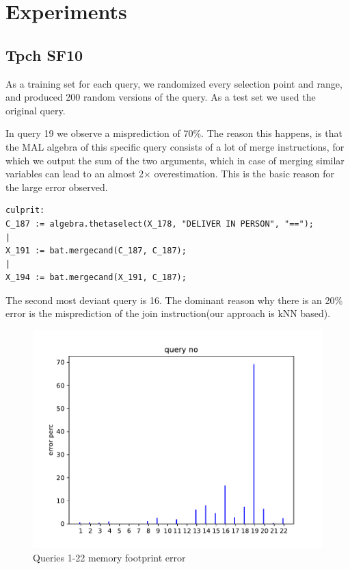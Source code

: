 \section{Experiments}
\subsection{Tpch SF10}
As a training set for each query, we randomized every selection point and range,
and produced 200 random versions of the query. As a test set we used the original
query.

In query 19 we observe a misprediction of 70\%. The reason this happens, is that
the MAL algebra of this specific query consists of a lot of merge instructions,
for which we output the sum of the two arguments, which in case of merging similar
variables can lead to an almost 2$\times$ overestimation.
This is the basic reason for the large error observed.
\begin{verbatim}
culprit:
C_187 := algebra.thetaselect(X_178, "DELIVER IN PERSON", "==");                                                                                                                                                                                                                    |
X_191 := bat.mergecand(C_187, C_187);                                                                                                                                                                                                                                              |
X_194 := bat.mergecand(X_191, C_187);
\end{verbatim}

The second most deviant query is 16. The dominant reason why there is an 20\%
error is the misprediction of the join instruction(our approach is kNN based).

\begin{figure}[!htb]
  \centering
  \includegraphics[scale=0.7]{figs/tpch10/mem_error_1-23.pdf}
  \caption{Queries 1-22 memory footprint error}
  \label{fig:tpch10m}
\end{figure}

